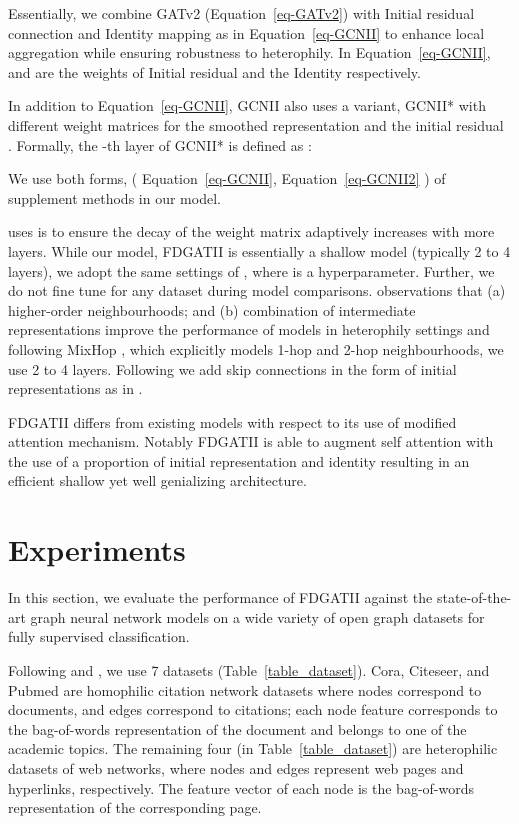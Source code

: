 \documentclass{article}
\begin{document}
Essentially, we combine GATv2 (Equation~\ref{eq-GATv2}) with Initial residual connection and Identity mapping as in Equation~\ref{eq-GCNII} to enhance local aggregation while ensuring robustness to heterophily. In Equation~\ref{eq-GCNII},  and  are the weights of Initial residual and the Identity respectively.

In addition to Equation~\ref{eq-GCNII}, GCNII also uses a variant, GCNII* with different weight matrices for the smoothed representation  and the initial residual . Formally, the -th layer of GCNII* is defined as : 



We use both forms, ( Equation~\ref{eq-GCNII}, Equation~\ref{eq-GCNII2} ) of  supplement methods in our model.

\citet{chen2020simple} uses  is to ensure the decay of the weight matrix adaptively increases with more layers. While our model, FDGATII is essentially a shallow model (typically 2 to 4 layers), we adopt the same settings of , where  is a hyperparameter. Further, we do not fine tune  for any dataset during model comparisons. \citet{zhu2020beyond} observations that (a) higher-order neighbourhoods; and (b) combination of intermediate representations improve the performance of models in heterophily settings and following MixHop \cite{abu2019mixhop}, which explicitly models 1-hop and 2-hop neighbourhoods, we use 2 to 4 layers. Following \citet{xu2018representation} we add skip connections in the form of initial representations  as in \citet{chen2020simple}.

FDGATII differs from existing models with respect to its use of modified attention mechanism. Notably FDGATII is able to augment self attention with the use of a proportion of initial representation and identity resulting in an efficient shallow yet well genializing architecture. 

\section{Experiments}
In this section, we evaluate the performance of FDGATII against the state-of-the-art graph neural network models on a wide variety of open graph datasets for fully supervised classification.

Following \citet{pei2019geom} and \citet{chen2020simple} , we use 7 datasets (Table~\ref{table_dataset}). Cora, Citeseer, and Pubmed are homophilic citation network datasets where nodes correspond to documents, and edges correspond to citations; each node feature corresponds to the bag-of-words representation of the document and belongs to one of the academic topics. The remaining four (in Table~\ref{table_dataset}) are heterophilic datasets of web networks, where nodes and edges represent web pages and hyperlinks, respectively. The feature vector of each node is the bag-of-words representation of the corresponding page. 
\end{document}
